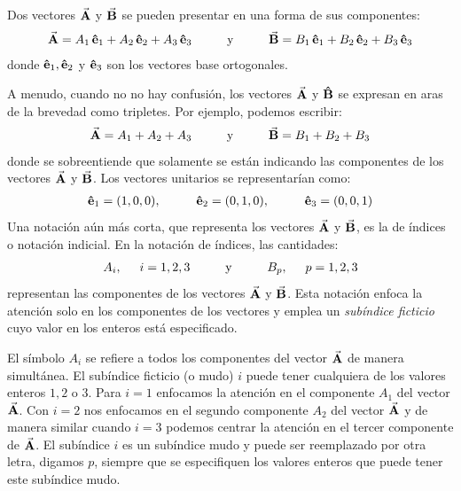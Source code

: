 \documentclass[hidelinks,12pt]{article}
\begin{document}
Dos vectores $\va{A}$ y $\va{B}$ se pueden presentar en una forma de sus componentes:
\begin{align*}
\va{A} = A_{1} \, \vu{e}_{1} + A_{2} \, \vu{e}_{2} + A_{3} \, \vu{e}_{3} \hspace{1cm} \mbox{y} \hspace{1cm} \va{B} = B_{1} \, \vu{e}_{1} + B_{2} \, \vu{e}_{2} + B_{3} \, \vu{e}_{3}
\end{align*}
donde $\vu{e}_{1}, \vu{e}_{2}$ y $\vu{e}_{3}$ son los vectores base ortogonales.
\par
A menudo, cuando no no hay confusión, los vectores $\va{A}$ y $\vu{B}$ se expresan en aras de la brevedad como tripletes. Por ejemplo, podemos escribir:
\begin{align*}
\va{A} = A_{1} + A_{2} + A_{3}  \hspace{1cm} \mbox{y} \hspace{1cm} \va{B} = B_{1} + B_{2} + B_{3}
\end{align*}
donde se sobreentiende que solamente se están indicando las componentes de los vectores $\va{A}$ y $\va{B}$. Los vectores unitarios se representarían como:
\begin{align*}
\vu{e}_{1} = (1, 0, 0), \hspace{1cm} \vu{e}_{2} = (0, 1, 0), \hspace{1cm} \vu{e}_{3} = (0, 0, 1)
\end{align*}
Una notación aún más corta, que representa los vectores $\va{A}$ y $\va{B}$, es la de índices o notación indicial. En la notación de índices, las cantidades:
\begin{align*}
A_{i}, \hspace{0.5cm} i = 1, 2, 3 \hspace{1cm} \mbox{y} \hspace{1cm} B_{p}, \hspace{0.5cm} p = 1, 2, 3
\end{align*}
representan las componentes de los vectores $\va{A}$ y $\va{B}$. Esta notación enfoca la atención solo en los componentes de los vectores y emplea un \emph{subíndice ficticio} cuyo valor en los enteros está especificado.
\par
El símbolo $A_{i}$ se refiere a todos los componentes del vector $\va{A}$ de manera simultánea. El subíndice ficticio (o mudo) $i$ puede tener cualquiera de los valores enteros $1, 2$ o $3$. Para $i = 1$ enfocamos la atención en el componente $A_{1}$ del vector $\va{A}$. Con $i = 2$ nos enfocamos en el segundo componente $A_{2}$ del vector $\va{A}$ y de manera similar cuando $i = 3$ podemos centrar la atención en el tercer componente de $\va{A}$. El subíndice $i$ es un subíndice mudo y puede ser reemplazado por otra letra, digamos $p$, siempre que se especifiquen los valores enteros que puede tener este subíndice mudo.
\end{document}
